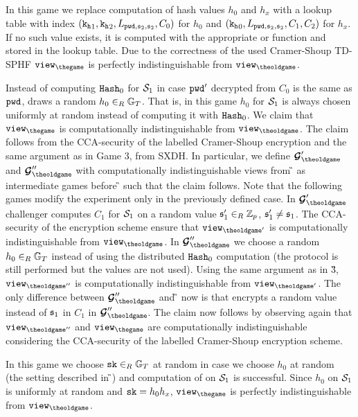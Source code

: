 \Gh In this game we replace computation of hash values $h_0$ and $h_x$ 
with a lookup table with index $(\mathtt{k_h}_1, \mathtt{k_h}_2, L_{\mathtt{pwd}, \mathfrak{s}_2, \mathfrak{s}_2}, C_0)$ for $h_0$ and $(\mathtt{k_h}_0, L_{\mathtt{pwd}, \mathfrak{s}_2, \mathfrak{s}_2}, C_1, C_2)$ for $h_x$.
If no such value exists, it is computed with the appropriate \Hash or \PHash function and stored in the lookup table.
Due to the correctness of the used Cramer-Shoup \ac{TD-SPHF} $\view_{\thegame}$ is perfectly indistinguishable from $\view_{\theoldgame}$.

\Gh Instead of computing $\mathtt{Hash}_0$ for $\mathcal{S}_1$ in case $\mathtt{pwd}'$ decrypted from $C_0$ is the same as $\mathtt{pwd}$, \Challenger draws a random $h_0\in_R\mathbb{G}_T$.
That is, in this game $h_0$ for $\mathcal{S}_1$ is always chosen uniformly at random instead of computing it with $\mathtt{Hash}_0$.
We claim that $\view_{\thegame}$ is computationally indistinguishable from $\view_{\theoldgame}$.
The claim follows from the \ac{CCA}-security of the labelled Cramer-Shoup encryption and the same argument as in Game 3, \ie from SXDH.
In particular, we define $\G{\theoldgame}'$ and $\G{\theoldgame}''$ with computationally indistinguishable views from \G{\theoldgame} as intermediate games before \G{\thegame} such that the claim follows.
Note that the following games modify the experiment only in the previously defined case.
In $\G{\theoldgame}'$ challenger \Challenger computes $C_1$ for $\mathcal{S}_1$ on a random value $\mathfrak{s}'_1\in_R\mathbb{Z}_p$, $\mathfrak{s}'_1\not=\mathfrak{s}_1$.
The \ac{CCA}-security of the encryption scheme ensure that $\view_{\theoldgame'}$ is computationally indistinguishable from $\view_{\theoldgame}$.
In $\G{\theoldgame}''$ we choose a random $h_0\in_R\mathbb{G}_T$ instead of using the distributed $\mathtt{Hash}_0$ computation (the protocol is still performed but the values are not used).
Using the same argument as in \G{3}, $\view_{\theoldgame''}$ is computationally indistinguishable from $\view_{\theoldgame'}$.
The only difference between $\G{\theoldgame}''$ and \G{\thegame} now is that \Challenger encrypts a random value instead of $\mathfrak{s}_1$ in $C_1$ in $\G{\theoldgame}''$.
The claim now follows by observing again that $\view_{\theoldgame''}$ and $\view_{\thegame}$ are computationally indistinguishable considering the \ac{CCA}-security of the labelled Cramer-Shoup encryption scheme.

\Gh In this game we choose $\mathtt{sk}\in_R\mathbb{G}_T$ at random in case we choose $h_0$ at random (the setting described in \G{\theoldgame}) and computation of \sk on $\mathcal{S}_1$ is successful.
Since $h_0$ on $\mathcal{S}_1$ is uniformly at random and $\mathtt{sk}=h_0h_x$, $\view_{\thegame}$ is perfectly indistinguishable from $\view_{\theoldgame}$.

